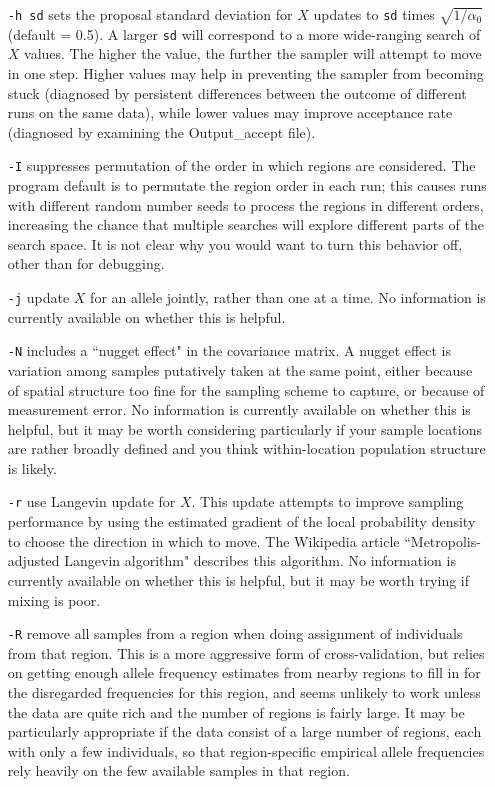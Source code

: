 \documentclass[10pt,titlepage,times,letterpaper]{article}
\begin{document}
\begin{itemize}
\item[{\tt -h sd}] sets the
proposal standard deviation for $X$ updates to {\tt sd} times
$\sqrt{1/\alpha_0}$ (default = 0.5).  A larger {\tt sd} 
will correspond to a 
more wide-ranging search of $X$ values.  The higher the value, the further
the sampler will attempt to move in one step.  Higher values may help
in preventing the sampler from becoming stuck (diagnosed by persistent
differences between the outcome of different runs on the same data), while
lower values may improve acceptance rate (diagnosed by examining the
Output\_accept file).

\item[{\tt -I}] suppresses permutation of the order in which regions are
considered.  The program default is to permutate the region order in each
run; this causes runs with different random number seeds to process the
regions in different orders, increasing the chance that multiple searches
will explore different parts of the search space.  It is not clear why you
would want to turn this behavior off, other than for debugging.

\item[{\tt -j}] update $X$ for an allele jointly, rather than one at a time.
No information is currently available on whether this is
helpful.

\item[{\tt -N}] includes a ``nugget effect" in the covariance matrix.  
A nugget effect is variation among samples putatively
taken at the same point, either because of spatial structure too fine
for the sampling scheme to capture, or because of measurement error.
No information is currently available on whether this is helpful, but it
may be worth considering particularly if your sample locations are
rather broadly defined and you think within-location population structure
is likely.


\item[{\tt -r}] use Langevin update for $X$.   This 
update attempts to improve sampling performance by using the estimated 
gradient of the local probability density to choose the direction in
which to move.  The Wikipedia article ``Metropolis-adjusted Langevin 
algorithm" describes this algorithm.  No information is currently
available on whether this is helpful, but it may be worth trying if
mixing is poor.

\item[{\tt -R}] remove
all samples from a region when doing assignment of individuals from
that region.  This is a more aggressive form of cross-validation,
but relies on getting enough allele frequency estimates from nearby
regions to fill in for the disregarded frequencies for this region, and
seems unlikely to work unless the data are quite rich and the number of
regions is fairly large.  It may be particularly appropriate if the
data consist of a large number of regions, each with only a few
individuals, so that region-specific empirical allele frequencies rely
heavily on the few available samples in that region.


\end{itemize}
\end{document}
